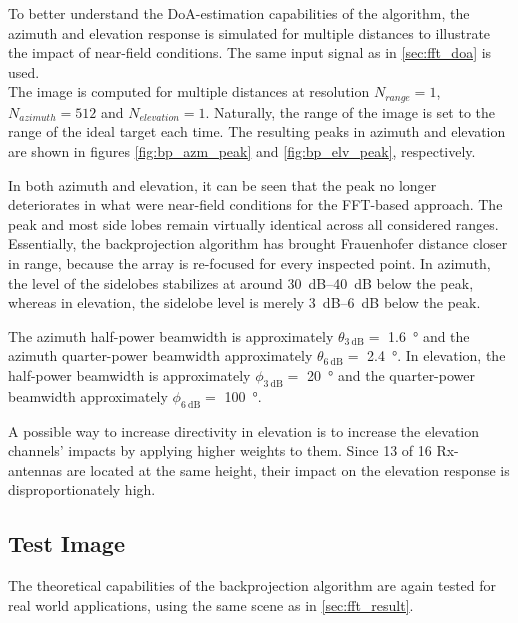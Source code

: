 To better understand the DoA-estimation capabilities of the algorithm,
the azimuth and elevation response is simulated for multiple distances to illustrate the impact of near-field conditions.
The same input signal as in \cref{sec:fft_doa} is used.
\\

The image is computed for multiple distances at resolution
$N_{range} = 1$, ${N_{azimuth} = 512}$ and $N_{elevation} = 1$.
Naturally, the range of the image is set to the range of the ideal target each time.
The resulting peaks in azimuth and elevation are shown in figures \ref{fig:bp_azm_peak} and \ref{fig:bp_elv_peak}, respectively.


In both azimuth and elevation, it can be seen that the peak no longer deteriorates in what were near-field conditions for the FFT-based approach.
The peak and most side lobes remain virtually identical across all considered ranges.
Essentially, the backprojection algorithm has brought Frauenhofer distance closer in range,
because the array is re-focused for every inspected point.
In azimuth, the level of the sidelobes stabilizes at around \SIrange{30}{40}{\dB} below the peak,
whereas in elevation, the sidelobe level is merely \SIrange{3}{6}{\dB} below the peak.

The azimuth half-power beamwidth is approximately $\theta_{\SI{3}{\dB}}=$ \SI{1.6}{\degree} and
the azimuth quarter-power beamwidth approximately $\theta_{\SI{6}{\dB}}=$ \SI{2.4}{\degree}.
In elevation, the half-power beamwidth is approximately $\phi_{\SI{3}{\dB}}=$ \SI{20}{\degree} and
the quarter-power beamwidth approximately $\phi_{\SI{6}{\dB}}=$ \SI{100}{\degree}.


A possible way to increase directivity in elevation is to increase the elevation channels' impacts by applying higher weights to them.
Since 13 of 16 Rx-antennas are located at the same height, their impact on the elevation response is disproportionately high.


\newpage
\subsection{Test Image}
The theoretical capabilities of the backprojection algorithm are again tested for real world applications,
using the same scene as in \cref{sec:fft_result}.

